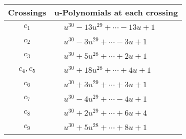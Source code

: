 \documentclass[1p]{elsarticle_modified}
\theoremstyle{definition}
\begin{document}
\begin{tabular}{m{50pt}|m{274pt}}
Crossings & \hspace{64pt}u-Polynomials at each crossing \\
\hline $$\begin{aligned}c_{1}\end{aligned}$$&$\begin{aligned}
&u^{30}-13 u^{29}+\cdots-13 u+1
\end{aligned}$\\
\hline $$\begin{aligned}c_{2}\end{aligned}$$&$\begin{aligned}
&u^{30}-3 u^{29}+\cdots-3 u+1
\end{aligned}$\\
\hline $$\begin{aligned}c_{3}\end{aligned}$$&$\begin{aligned}
&u^{30}+5 u^{28}+\cdots+2 u+1
\end{aligned}$\\
\hline $$\begin{aligned}c_{4},c_{5}\end{aligned}$$&$\begin{aligned}
&u^{30}+18 u^{28}+\cdots+4 u+1
\end{aligned}$\\
\hline $$\begin{aligned}c_{6}\end{aligned}$$&$\begin{aligned}
&u^{30}+3 u^{29}+\cdots+3 u+1
\end{aligned}$\\
\hline $$\begin{aligned}c_{7}\end{aligned}$$&$\begin{aligned}
&u^{30}-4 u^{29}+\cdots-4 u+1
\end{aligned}$\\
\hline $$\begin{aligned}c_{8}\end{aligned}$$&$\begin{aligned}
&u^{30}+2 u^{29}+\cdots+6 u+4
\end{aligned}$\\
\hline $$\begin{aligned}c_{9}\end{aligned}$$&$\begin{aligned}
&u^{30}+5 u^{28}+\cdots+8 u+1
\end{aligned}$\\

\end{tabular}
\end{document}
